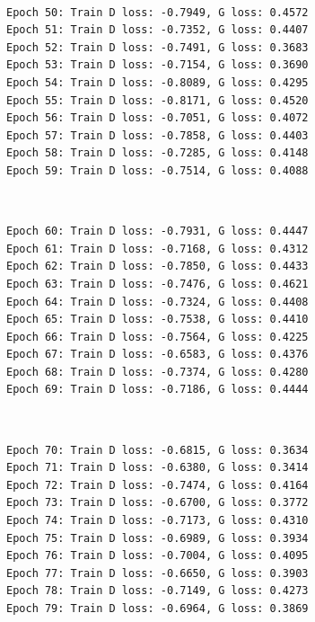 \documentclass[11pt]{article}
\begin{document}
    \begin{center}
    \end{center}
    { \hspace*{\fill} \\}
    
    \begin{Verbatim}[commandchars=\\\{\}]
Epoch 50: Train D loss: -0.7949, G loss: 0.4572
Epoch 51: Train D loss: -0.7352, G loss: 0.4407
Epoch 52: Train D loss: -0.7491, G loss: 0.3683
Epoch 53: Train D loss: -0.7154, G loss: 0.3690
Epoch 54: Train D loss: -0.8089, G loss: 0.4295
Epoch 55: Train D loss: -0.8171, G loss: 0.4520
Epoch 56: Train D loss: -0.7051, G loss: 0.4072
Epoch 57: Train D loss: -0.7858, G loss: 0.4403
Epoch 58: Train D loss: -0.7285, G loss: 0.4148
Epoch 59: Train D loss: -0.7514, G loss: 0.4088

    \end{Verbatim}

    \begin{center}
    \end{center}
    { \hspace*{\fill} \\}
    
    \begin{Verbatim}[commandchars=\\\{\}]
Epoch 60: Train D loss: -0.7931, G loss: 0.4447
Epoch 61: Train D loss: -0.7168, G loss: 0.4312
Epoch 62: Train D loss: -0.7850, G loss: 0.4433
Epoch 63: Train D loss: -0.7476, G loss: 0.4621
Epoch 64: Train D loss: -0.7324, G loss: 0.4408
Epoch 65: Train D loss: -0.7538, G loss: 0.4410
Epoch 66: Train D loss: -0.7564, G loss: 0.4225
Epoch 67: Train D loss: -0.6583, G loss: 0.4376
Epoch 68: Train D loss: -0.7374, G loss: 0.4280
Epoch 69: Train D loss: -0.7186, G loss: 0.4444

    \end{Verbatim}

    \begin{center}
    \end{center}
    { \hspace*{\fill} \\}
    
    \begin{Verbatim}[commandchars=\\\{\}]
Epoch 70: Train D loss: -0.6815, G loss: 0.3634
Epoch 71: Train D loss: -0.6380, G loss: 0.3414
Epoch 72: Train D loss: -0.7474, G loss: 0.4164
Epoch 73: Train D loss: -0.6700, G loss: 0.3772
Epoch 74: Train D loss: -0.7173, G loss: 0.4310
Epoch 75: Train D loss: -0.6989, G loss: 0.3934
Epoch 76: Train D loss: -0.7004, G loss: 0.4095
Epoch 77: Train D loss: -0.6650, G loss: 0.3903
Epoch 78: Train D loss: -0.7149, G loss: 0.4273
Epoch 79: Train D loss: -0.6964, G loss: 0.3869

    \end{Verbatim}
\end{document}
